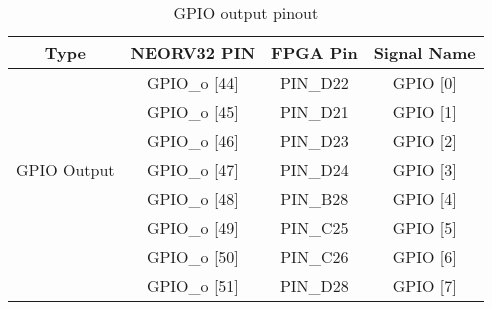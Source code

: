 \begin{table}[!htb]\scriptsize
    \centering
    \begin{tabular}{c c c c}
        \toprule[1.5pt]
        \textbf{Type} & \quad \quad \textbf{NEORV32 PIN} & \quad \quad \textbf{FPGA Pin} & \quad \quad \textbf{Signal Name}  \\
          
        \midrule
                    & \quad \quad GPIO\_o [44] & \quad \quad PIN\_D22  & \quad \quad GPIO [0]\\
                    & \quad \quad GPIO\_o [45] & \quad \quad PIN\_D21  & \quad \quad GPIO [1]\\
                    & \quad \quad GPIO\_o [46] & \quad \quad PIN\_D23  & \quad \quad GPIO [2]\\
        GPIO Output & \quad \quad GPIO\_o [47] & \quad \quad PIN\_D24  & \quad \quad GPIO [3]\\        
                    & \quad \quad GPIO\_o [48] & \quad \quad PIN\_B28  & \quad \quad GPIO [4]\\
                    & \quad \quad GPIO\_o [49] & \quad \quad PIN\_C25  & \quad \quad GPIO [5]\\
                    & \quad \quad GPIO\_o [50] & \quad \quad PIN\_C26  & \quad \quad GPIO [6]\\
                    & \quad \quad GPIO\_o [51] & \quad \quad PIN\_D28  & \quad \quad GPIO [7]\\
            \bottomrule[1.5pt]
         
    \end{tabular}
    \caption{\label{tab:gpio_o}GPIO output pinout}
\end{table}

